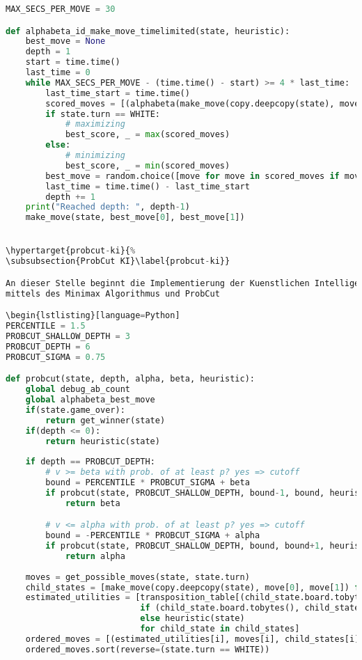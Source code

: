 \begin{lstlisting}[language=Python]
MAX_SECS_PER_MOVE = 30

def alphabeta_id_make_move_timelimited(state, heuristic):
    best_move = None
    depth = 1
    start = time.time()
    last_time = 0
    while MAX_SECS_PER_MOVE - (time.time() - start) >= 4 * last_time:
        last_time_start = time.time()
        scored_moves = [(alphabeta(make_move(copy.deepcopy(state), move[0], move[1]), depth-1, -math.inf, math.inf, heuristic), move) for move in state.possible_moves]
        if state.turn == WHITE:
            # maximizing
            best_score, _ = max(scored_moves)
        else:
            # minimizing
            best_score, _ = min(scored_moves)
        best_move = random.choice([move for move in scored_moves if move[0] == best_score])[1]
        last_time = time.time() - last_time_start
        depth += 1
    print("Reached depth: ", depth-1)
    make_move(state, best_move[0], best_move[1])


\hypertarget{probcut-ki}{%
\subsubsection{ProbCut KI}\label{probcut-ki}}

An dieser Stelle beginnt die Implementierung der Kuenstlichen Intelligenz
mittels des Minimax Algorithmus und ProbCut

\begin{lstlisting}[language=Python]
PERCENTILE = 1.5
PROBCUT_SHALLOW_DEPTH = 3
PROBCUT_DEPTH = 6
PROBCUT_SIGMA = 0.75

def probcut(state, depth, alpha, beta, heuristic):
    global debug_ab_count
    global alphabeta_best_move
    if(state.game_over):
        return get_winner(state)
    if(depth <= 0):
        return heuristic(state)
    
    if depth == PROBCUT_DEPTH:
        # v >= beta with prob. of at least p? yes => cutoff
        bound = PERCENTILE * PROBCUT_SIGMA + beta
        if probcut(state, PROBCUT_SHALLOW_DEPTH, bound-1, bound, heuristic) >= bound:
            return beta

        # v <= alpha with prob. of at least p? yes => cutoff
        bound = -PERCENTILE * PROBCUT_SIGMA + alpha
        if probcut(state, PROBCUT_SHALLOW_DEPTH, bound, bound+1, heuristic) <= bound:
            return alpha
    
    moves = get_possible_moves(state, state.turn)
    child_states = [make_move(copy.deepcopy(state), move[0], move[1]) for move in moves]
    estimated_utilities = [transposition_table[(child_state.board.tobytes(), child_state.turn, heuristic)]
                           if (child_state.board.tobytes(), child_state.turn, heuristic) in transposition_table
                           else heuristic(state)
                           for child_state in child_states]
    ordered_moves = [(estimated_utilities[i], moves[i], child_states[i]) for i in range(len(moves))]
    ordered_moves.sort(reverse=(state.turn == WHITE))
    

\end{lstlisting}

